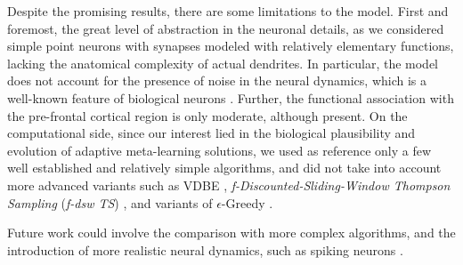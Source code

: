 Despite the promising results, there are some limitations to the model. First and foremost, the great level of abstraction in the neuronal details, as we considered simple point neurons with synapses modeled with relatively elementary functions, lacking the anatomical complexity of actual dendrites.
In particular, the model does not account for the presence of noise in the neural dynamics, which is a well-known feature of biological neurons \cite{faisalNoiseNeuronsOther2012}.
Further, the functional association with the pre-frontal cortical region is only moderate, although present.
On the computational side, since our interest lied in the biological plausibility and evolution of adaptive meta-learning solutions, we used as reference only a few well established and relatively simple algorithms, and did not take into account more advanced variants such as VDBE
\cite{tokicAdaptiveEGreedyExploration2010, tokicValueDifferenceBasedExploration2011}, \textit{f-Discounted-Sliding-Window Thompson Sampling} (\textit{f-dsw TS}) \cite{cavenaghiNonStationaryMultiArmed2021}, and variants of $\epsilon$-Greedy \cite{qiForcedExplorationBandit2023}.

Future work could involve the comparison with more complex algorithms, and the introduction of more realistic neural dynamics, such as spiking neurons \cite{nunesSpikingNeuralNetworks2022}.


